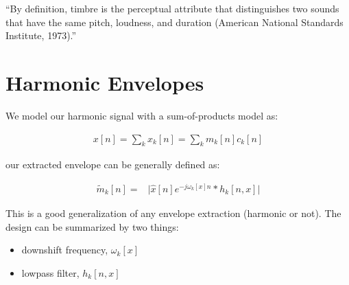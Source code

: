 \documentclass [11pt, proquest] {uwthesis}[2015/03/03]
\begin{document}
``By definition, timbre is the perceptual attribute that distinguishes two sounds that have the same pitch, loudness, and duration (American National Standards Institute, 1973).''


\chapter{Harmonic Envelopes}

We model our harmonic signal with a sum-of-products model as:

\begin{align}
\label{eq:sum_of_products}
x[n] = \sum\limits_k x_k[n] = \sum\limits_k m_k[n] c_k[n]
\end{align}

our extracted envelope can be generally defined as:

\begin{align}
\label{eq:envelope_extraction}
\tilde{m}_k[n] =& \Big| \widehat{x}[n]e^{-j \omega_k[x]n} * h_k[n,x]  \Big|
\end{align}

This is a good generalization of any envelope extraction (harmonic or not). The design can be summarized by two things:

\begin{itemize}
\item downshift frequency, $\omega_k[x]$
\item lowpass filter, $h_k[n,x]$
\end{itemize}
\end{document}

